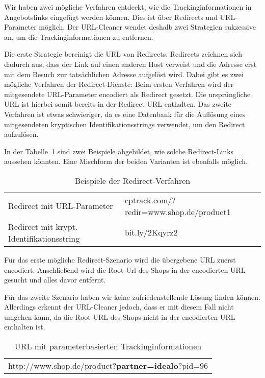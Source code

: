 Wir haben zwei mögliche Verfahren entdeckt, wie die Trackinginformationen in Angebotslinks eingefügt werden können.
Dies ist über Redirects und URL-Parameter möglich.
Der URL-Cleaner wendet deshalb zwei Strategien sukzessive an, um die Trackinginformationen zu entfernen.

Die erste Strategie bereinigt die URL von Redirects.
Redirects zeichnen sich dadurch aus, dass der Link auf einen anderen Host verweist und die Adresse erst mit dem
Besuch zur tatsächlichen Adresse aufgelöst wird.
Dabei gibt es zwei mögliche Verfahren der Redirect-Dienste:
Beim ersten Verfahren wird der mitgesendete URL-Parameter encodiert als Redirect gesetzt.
Die ursprüngliche URL ist hierbei somit bereits in der Redirect-URL enthalten.
Das zweite Verfahren ist etwas schwieriger, da es eine Datenbank für die Auflösung eines mitgesendeten kryptischen
Identifikationsstrings verwendet, um den Redirect aufzulösen.

In der Tabelle~\ref{tab:redirect} sind zwei Beispiele abgebildet, wie solche Redirect-Links aussehen könnten.
Eine Mischform der beiden Varianten ist ebenfalls möglich.

\begin{table}[h]
    \centering
    \begin{tabular}{ l | l }
        Redirect mit URL-Parameter                  &   cptrack.com/?redir=www.shop.de/product1\\
        Redirect mit krypt. Identifikationsstring   &   bit.ly/2Kqyrz2
    \end{tabular}
    \caption{Beispiele der Redirect-Verfahren}
    \label{tab:redirect}
\end{table}

Für das erste mögliche Redirect-Szenario wird die übergebene URL zuerst encodiert.
Anschließend wird die Root-Url des Shops in der encodierten URL gesucht und alles davor entfernt.

Für das zweite Szenario haben wir keine zufriedenstellende Lösung finden können.
Allerdings erkennt der URL-Cleaner jedoch, dass er mit diesem Fall nicht umgehen kann, da die Root-URL des Shops
nicht in der encodierten URL enthalten ist.

\begin{table}[h]
    \centering
    \begin{tabular}{ c }
        http://www.shop.de/product?\textbf{partner=idealo}?pid=96
    \end{tabular}
    \caption{URL mit parameterbasierten Trackinginformationen}
    \label{tab:trackparameter}
\end{table}

